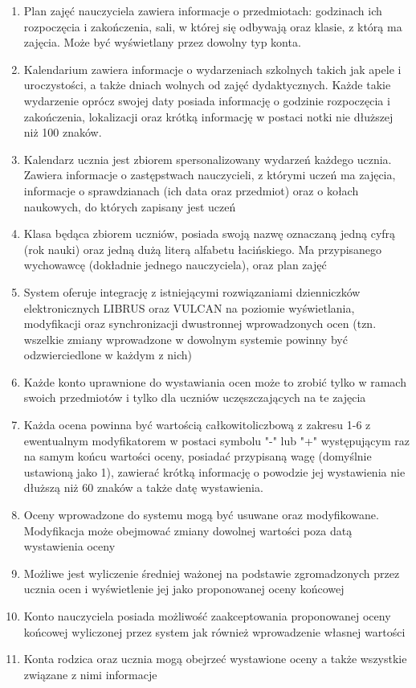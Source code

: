 \documentclass{article}
\begin{document}
\begin{enumerate}
    \item Plan zajęć nauczyciela zawiera informacje o przedmiotach: godzinach ich rozpoczęcia i zakończenia, sali, w której się odbywają oraz klasie, z którą ma zajęcia. Może być wyświetlany przez dowolny typ konta.
    \item Kalendarium zawiera informacje o wydarzeniach szkolnych takich jak apele i uroczystości, a także dniach wolnych od zajęć dydaktycznych. Każde takie wydarzenie oprócz swojej daty posiada informację o godzinie rozpoczęcia i zakończenia, lokalizacji oraz krótką informację w postaci notki nie dłuższej niż 100 znaków.
    \item Kalendarz ucznia jest zbiorem spersonalizowany wydarzeń każdego ucznia. Zawiera informacje o zastępstwach nauczycieli, z którymi uczeń ma zajęcia, informacje o sprawdzianach (ich data oraz przedmiot) oraz o kołach naukowych, do których zapisany jest uczeń
    \item Klasa będąca zbiorem uczniów, posiada swoją nazwę oznaczaną jedną cyfrą (rok nauki) oraz jedną dużą literą alfabetu łacińskiego. Ma przypisanego wychowawcę (dokładnie jednego nauczyciela), oraz plan zajęć
    \item System oferuje integrację z istniejącymi rozwiązaniami dzienniczków elektronicznych LIBRUS oraz VULCAN na poziomie wyświetlania, modyfikacji oraz synchronizacji dwustronnej wprowadzonych ocen (tzn. wszelkie zmiany wprowadzone w dowolnym systemie powinny być odzwierciedlone w każdym z nich)
    \item Każde konto uprawnione do wystawiania ocen może to zrobić tylko w ramach swoich przedmiotów i tylko dla uczniów uczęszczających na te zajęcia
    \item Każda ocena powinna być wartością całkowitoliczbową z zakresu 1-6 z ewentualnym modyfikatorem w postaci symbolu "-" lub "+" występującym raz na samym końcu wartości oceny, posiadać przypisaną wagę (domyślnie ustawioną jako 1), zawierać krótką informację o powodzie jej wystawienia nie dłuższą niż 60 znaków a także datę wystawienia.
    \item Oceny wprowadzone do systemu mogą być usuwane oraz modyfikowane. Modyfikacja może obejmować zmiany dowolnej wartości poza datą wystawienia oceny
    \item Możliwe jest wyliczenie średniej ważonej na podstawie zgromadzonych przez ucznia ocen i wyświetlenie jej jako proponowanej oceny końcowej
    \item Konto nauczyciela posiada możliwość zaakceptowania proponowanej oceny końcowej wyliczonej przez system jak również wprowadzenie własnej wartości
    \item Konta rodzica oraz ucznia mogą obejrzeć wystawione oceny a także wszystkie związane z nimi informacje
\end{enumerate}
\end{document}
